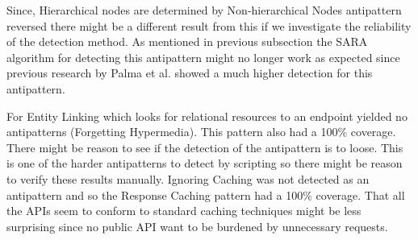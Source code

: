 Since, Hierarchical nodes are determined by Non-hierarchical Nodes antipattern reversed there might be a different result from this if we investigate the reliability of the detection method. As mentioned in previous subsection the SARA algorithm for detecting this antipattern might no longer work as expected since previous research by Palma et al. \cite{linguistic} showed a much higher detection for this antipattern.

For Entity Linking which looks for relational resources to an endpoint yielded no antipatterns (Forgetting Hypermedia). This pattern also had a 100\% coverage. There might be reason to see if the detection of the antipattern is to loose. This is one of the harder antipatterns to detect by scripting so there might be reason to verify these results manually. Ignoring Caching was not detected as an antipattern and so the Response Caching pattern had a 100\% coverage. That all the APIs seem to conform to standard caching techniques might be less surprising since no public API want to be burdened by unnecessary requests.  

\clearpage
\newpage